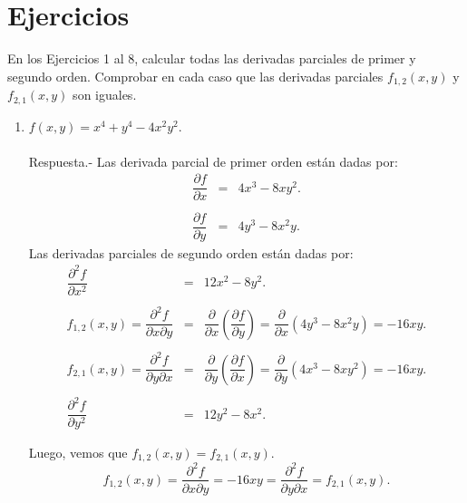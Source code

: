 \section{Ejercicios}
En los Ejercicios 1 al 8, calcular todas las derivadas parciales de primer y segundo orden. Comprobar en cada caso que las derivadas parciales $f_{1,2}(x,y)$ y $f_{2,1}(x,y)$ son iguales.\\

\begin{enumerate}[\bfseries 1.]

    \item $f(x,y)=x^4+y^4-4x^2y^2$.\\\\
	Respuesta.-\; Las derivada parcial de primer orden están dadas por:
	$$\begin{array}{rcl}
	    \dfrac{\partial f}{\partial x}&=&4x^3-8xy^2.\\\\
	    \dfrac{\partial f}{\partial y}&=&4y^3-8x^2y.
	\end{array}$$
	Las derivadas parciales de segundo orden están dadas por:
	$$\begin{array}{rcl}
	    \dfrac{\partial^2 f}{\partial x^2}&=&12x^2-8y^2.\\\\
	    f_{1,2}(x,y)=\dfrac{\partial^2 f}{\partial x\partial y}&=&\dfrac{\partial}{\partial x}\left(\dfrac{\partial f}{\partial y}\right)=\dfrac{\partial}{\partial x}\left(4y^3-8x^2y\right)=-16xy.\\\\
	    f_{2,1}(x,y)=\dfrac{\partial^2 f}{\partial y\partial x}&=&\dfrac{\partial}{\partial y}\left(\dfrac{\partial f}{\partial x}\right)=\dfrac{\partial}{\partial y}\left(4x^3-8xy^2\right)=-16xy.\\\\
	    \dfrac{\partial^2 f}{\partial y^2}&=&12y^2-8x^2.\\\\
	\end{array}$$
	Luego, vemos que $f_{1,2}(x,y)=f_{2,1}(x,y)$.
	$$f_{1,2}(x,y)=\dfrac{\partial^2f}{\partial x \partial y}=-16xy=\dfrac{\partial^2 f}{\partial y \partial x}=f_{2,1}(x,y).$$\\


\end{enumerate}
